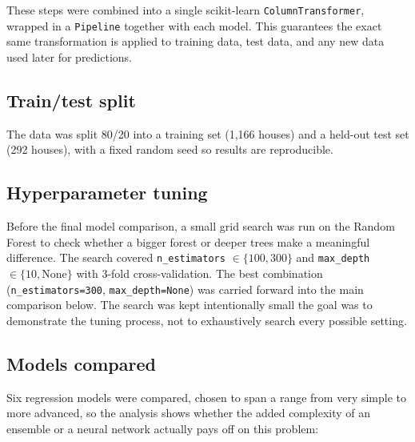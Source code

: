 \documentclass[11pt]{article}
\begin{document}
These steps were combined into a single scikit-learn \texttt{ColumnTransformer},
wrapped in a \texttt{Pipeline} together with each model. This guarantees the exact
same transformation is applied to training data, test data, and any new data used
later for predictions.

\subsection{Train/test split}

The data was split 80/20 into a training set (1,166 houses) and a held-out test set
(292 houses), with a fixed random seed so results are reproducible.

\subsection{Hyperparameter tuning}

Before the final model comparison, a small grid search was run on the Random Forest to
check whether a bigger forest or deeper trees make a meaningful difference. The
search covered \texttt{n\_estimators} $\in \{100, 300\}$ and \texttt{max\_depth} $\in
\{10, \text{None}\}$ with 3-fold cross-validation. The best combination
(\texttt{n\_estimators=300}, \texttt{max\_depth=None}) was carried forward into the
main comparison below. The search was kept intentionally small  the goal was to
demonstrate the tuning process, not to exhaustively search every possible setting.

\subsection{Models compared}

Six regression models were compared, chosen to span a range from very simple to more
advanced, so the analysis shows whether the added complexity of an ensemble or a
neural network actually pays off on this problem:
\end{document}
